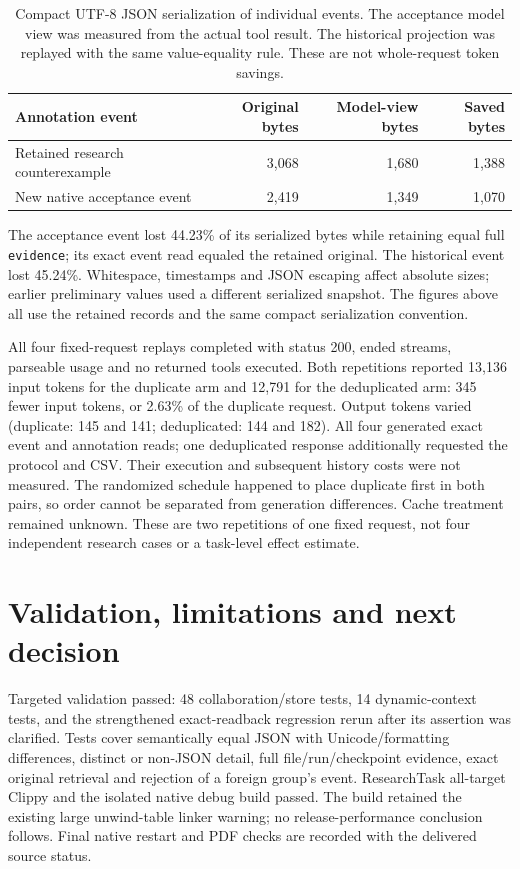 \documentclass[11pt,a4paper]{article}
\begin{document}
\begin{table}[ht]
\centering\small
\begin{tabular}{@{}lrrr@{}}
\toprule
Annotation event & Original bytes & Model-view bytes & Saved bytes\\
\midrule
Retained research counterexample & 3,068 & 1,680 & 1,388\\
New native acceptance event & 2,419 & 1,349 & 1,070\\
\bottomrule
\end{tabular}
\caption{Compact UTF-8 JSON serialization of individual events. The acceptance model view was measured from the actual tool result. The historical projection was replayed with the same value-equality rule. These are not whole-request token savings.}
\end{table}

The acceptance event lost 44.23\% of its serialized bytes while retaining equal full \texttt{evidence}; its exact event read equaled the retained original. The historical event lost 45.24\%. Whitespace, timestamps and JSON escaping affect absolute sizes; earlier preliminary values used a different serialized snapshot. The figures above all use the retained records and the same compact serialization convention.

All four fixed-request replays completed with status 200, ended streams, parseable usage and no returned tools executed. Both repetitions reported 13,136 input tokens for the duplicate arm and 12,791 for the deduplicated arm: 345 fewer input tokens, or 2.63\% of the duplicate request. Output tokens varied (duplicate: 145 and 141; deduplicated: 144 and 182). All four generated exact event and annotation reads; one deduplicated response additionally requested the protocol and CSV. Their execution and subsequent history costs were not measured. The randomized schedule happened to place duplicate first in both pairs, so order cannot be separated from generation differences. Cache treatment remained unknown. These are two repetitions of one fixed request, not four independent research cases or a task-level effect estimate.

\section{Validation, limitations and next decision}
Targeted validation passed: 48 collaboration/store tests, 14 dynamic-context tests, and the strengthened exact-readback regression rerun after its assertion was clarified. Tests cover semantically equal JSON with Unicode/formatting differences, distinct or non-JSON detail, full file/run/checkpoint evidence, exact original retrieval and rejection of a foreign group's event. ResearchTask all-target Clippy and the isolated native debug build passed. The build retained the existing large unwind-table linker warning; no release-performance conclusion follows. Final native restart and PDF checks are recorded with the delivered source status.
\end{document}
